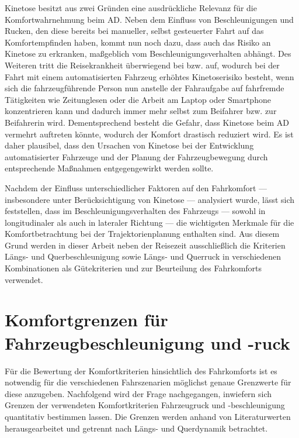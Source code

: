 Kinetose besitzt aus zwei Gründen eine ausdrückliche Relevanz für die Komfortwahrnehmung beim \gls{AD}. Neben dem Einfluss von Beschleunigungen und Rucken, den diese bereits bei manueller, selbst gesteuerter Fahrt auf das Komfortempfinden haben, kommt nun noch dazu, dass auch das Risiko an Kinetose zu erkranken, maßgeblich vom Beschleunigungsverhalten abhängt. Des Weiteren tritt die Reisekrankheit überwiegend bei  bzw.  auf, wodurch bei der Fahrt mit einem automatisierten Fahrzeug erhöhtes Kinetoserisiko besteht, wenn sich die fahrzeugführende Person nun anstelle der Fahraufgabe auf fahrfremde Tätigkeiten wie Zeitunglesen oder die Arbeit am Laptop oder Smartphone konzentrieren kann und dadurch immer mehr selbst zum Beifahrer bzw. zur Beifahrerin wird. Dementsprechend besteht die Gefahr, dass Kinetose beim \gls{AD} vermehrt auftreten könnte, wodurch der Komfort drastisch reduziert wird. Es ist daher plausibel, dass den Ursachen von Kinetose bei der Entwicklung automatisierter Fahrzeuge und der Planung der Fahrzeugbewegung durch entsprechende Maßnahmen entgegengewirkt werden sollte. 

Nachdem der Einfluss unterschiedlicher Faktoren auf den Fahrkomfort --- insbesondere unter Berücksichtigung von Kinetose --- analysiert wurde, lässt sich feststellen, dass im Beschleunigungsverhalten des Fahrzeugs --- sowohl in longitudinaler als auch in lateraler Richtung --- die wichtigsten Merkmale für die Komfortbetrachtung bei der Trajektorienplanung enthalten sind. Aus diesem Grund werden in dieser Arbeit neben der Reisezeit ausschließlich die Kriterien Längs- und Querbeschleunigung sowie Längs- und Querruck in verschiedenen Kombinationen als Gütekriterien und zur Beurteilung des Fahrkomforts verwendet. 

\section{Komfortgrenzen für Fahrzeugbeschleunigung und -ruck} \label{sec:komfortgrenzen}
Für die Bewertung der Komfortkriterien hinsichtlich des Fahrkomforts ist es notwendig für die verschiedenen Fahrszenarien möglichst genaue Grenzwerte für diese anzugeben. Nachfolgend wird der Frage nachgegangen, inwiefern sich Grenzen der verwendeten Komfortkriterien Fahrzeugruck und -beschleunigung quantitativ bestimmen lassen. Die Grenzen werden anhand von Literaturwerten herausgearbeitet und getrennt nach Längs- und Querdynamik betrachtet.

